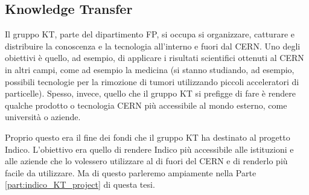 		\subsection{Knowledge Transfer} \label{subsec:C;l;KT}
		
			Il gruppo \ac{KT}, parte del dipartimento \ac{FP}, si occupa si organizzare, catturare e distribuire la conoscenza e la tecnologia all'interno e fuori dal \ac{CERN}. Uno degli obiettivi è quello, ad esempio, di applicare i risultati scientifici ottenuti al \ac{CERN} in altri campi, come ad esempio la medicina (si stanno studiando, ad esempio, possibili tecnologie per la rimozione di tumori utilizzando piccoli acceleratori di particelle). Spesso, invece, quello che il gruppo \ac{KT} si prefigge di fare è rendere qualche prodotto o tecnologia \ac{CERN} più accessibile al mondo esterno, come università o aziende.
			
			Proprio questo era il fine dei fondi che il gruppo \ac{KT} ha destinato al progetto Indico. L'obiettivo era quello di rendere Indico più accessibile alle istituzioni e alle aziende che lo volessero utilizzare al di fuori del \ac{CERN} e di renderlo più facile da utilizzare. Ma di questo parleremo ampiamente nella Parte \ref{part:indico_KT_project} di questa tesi.
